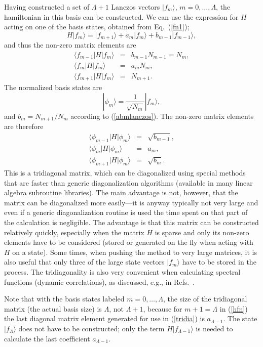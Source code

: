 \documentclass[draft,numberedheadings]{aipproc}
\begin{document}
Having constructed a set of $\Lambda+1$  Lanczos vectors $|f_m\rangle$, $m=0,\ldots,\Lambda$, the hamiltonian in this basis can be constructed. 
We can use the expression for $H$ acting on one of the basis states, obtained from Eq.~(\ref{fn1});
\begin{equation}
H|f_m\rangle = |f_{m+1}\rangle  + a_m|f_m\rangle + b_{m-1}|f_{m-1}\rangle ,
\label{hfn}
\end{equation}
and thus the non-zero matrix elements are
\begin{eqnarray}
\langle f_{m-1}|H|f_m\rangle & = & b_{m-1}N_{m-1} = N_m, \nonumber \\
\langle f_{m}|H|f_m\rangle & = & a_{m}N_{m},  \\
\langle f_{m+1}|H|f_m\rangle & = &  N_{m+1}. \nonumber 
\end{eqnarray}
The normalized basis states are
\begin{equation}
|\phi_m\rangle = \frac{1}{\sqrt{N_m}}|f_m\rangle,
\end{equation}
and $b_m=N_{m+1}/N_m$ according to (\ref{abmlanczos}). The non-zero matrix elements are therefore
\begin{eqnarray}
\langle \phi_{m-1}|H|\phi_m\rangle & = & \sqrt{b_{m-1}}, \nonumber \\
\langle \phi_{m}|H|\phi_m\rangle & = & a_{m},  \\
\langle \phi_{m+1}|H|\phi_m\rangle & = &  \sqrt{b_{m}} . \nonumber 
\label{tridia}
\end{eqnarray}
This is a tridiagonal matrix, which can be diagonalized using special methods that are faster than generic diagonalization algorithms (available in many 
linear algebra subroutine libraries). The main advantage is not, however, that the matrix can be diagonalized more easily---it is anyway typically not 
very large and even if a generic diagonalization routine is used the time spent on that part of the calculation is negligible. The advantage
is that this matrix can be constructed relatively quickly, especially when the matrix $H$ is sparse and only its non-zero elements have to be considered
(stored or generated on the fly when acting with $H$ on a state). Some times, when pushing the method to very large matrices, it is also useful that only 
three of the large state vectors $|f_m\rangle$ have to be stored in the process. The tridiagonality is also very convenient when calculating spectral 
functions (dynamic correlations), as discussed, e.g., in Refs.~\cite{dagotto2,didier}.

Note that with the basis states labeled $m=0,\ldots,\Lambda$, the size of the tridiagonal matrix (the actual basis size) is $\Lambda$, not $\Lambda+1$, 
because for $m+1=\Lambda$ in (\ref{hfn}) the last diagonal matrix element generated for use in (\ref{tridia}) is $a_{\Lambda-1}$. The state $|f_{\Lambda}\rangle$ 
does not have to be constructed; only the term $H|f_{\Lambda -1}\rangle$ is needed to calculate the last coefficient $a_{\Lambda-1}$.
\end{document}
